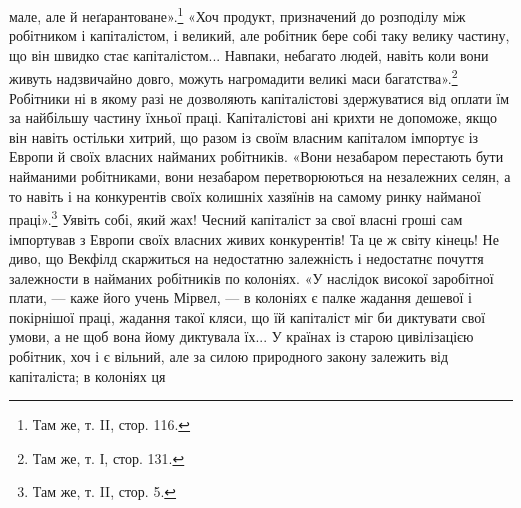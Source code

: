 \parcont{}  %
мале, але й неґарантоване».\footnote{
Там же, т. II, стор. 116.
} «Хоч продукт, призначений до розподілу між робітником і капіталістом,
і великий, але робітник бере собі таку велику частину, що він швидко стає капіталістом... Навпаки,
небагато людей, навіть коли вони живуть надзвичайно довго, можуть нагромадити великі маси
багатства».\footnote{
Там же, т. І, стор. 131.
} Робітники ні в якому разі не дозволяють капіталістові здержуватися від оплати їм за
найбільшу частину їхньої праці. Капіталістові ані крихти не допоможе, якщо він навіть
остільки хитрий, що разом із своїм власним капіталом імпортує із Европи й своїх власних найманих
робітників. «Вони незабаром перестають бути найманими робітниками, вони незабаром перетворюються на
незалежних селян, а то навіть і на конкурентів своїх колишніх хазяїнів на самому ринку найманої
праці».\footnote{
Там же, т. II, стор. 5.
} Уявіть собі, який жах! Чесний капіталіст за свої власні гроші сам імпортував з Европи
своїх власних живих конкурентів! Та це ж світу кінець! Не диво, що Векфілд скаржиться на недостатню
залежність і недостатнє почуття залежности в найманих робітників по колоніях. «У наслідок високої
заробітної плати, — каже його учень Мірвел, — в колоніях є палке жадання дешевої і покірнішої праці,
жадання такої кляси, що їй капіталіст
міг би диктувати свої умови, а не щоб вона йому диктувала їх... У країнах із старою цивілізацією
робітник, хоч і є вільний, але за силою природного закону залежить від капіталіста; в колоніях ця
